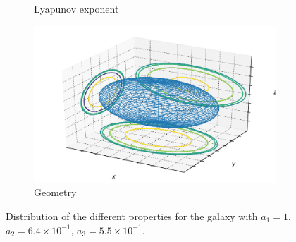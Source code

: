 \begin{figure}[h]
\begin{subfigure}[t]{0.4\textwidth}
        \caption{Lyapunov exponent}
    \end{subfigure}
    \begin{subfigure}[t]{0.4\textwidth}
        \includegraphics[width=\textwidth]{"../Files/Week 13/images/2_ellipsoid"}
        \caption{Geometry}
    \end{subfigure}
    \caption{Distribution of the different properties for the galaxy with $a_1 = 1$, $a_2 = 6.4\times10^{-1}$, $a_3 = 5.5\times10^{-1}$.}
\end{figure}



